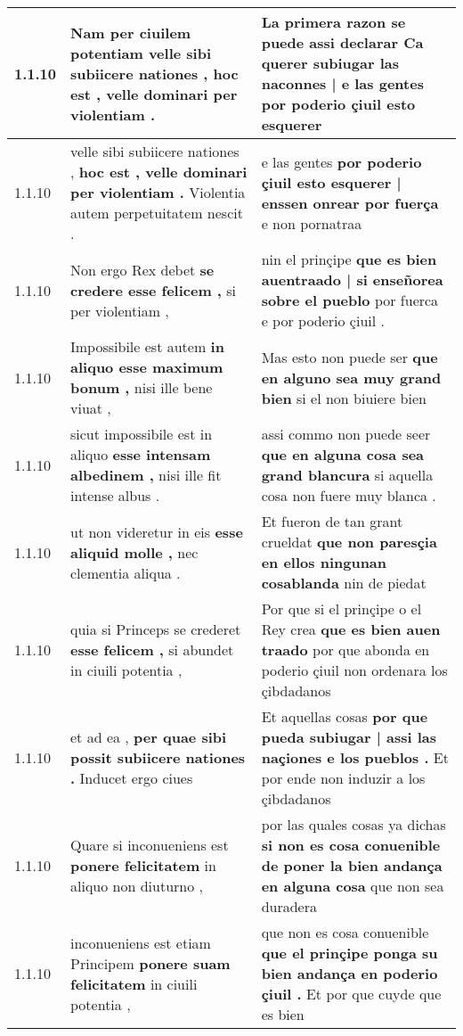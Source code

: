 \begin{tabular}{|p{1cm}|p{6.5cm}|p{6.5cm}|}
1.1.10 & Nam per ciuilem potentiam \textbf{ velle sibi subiicere nationes , } hoc est , velle dominari per violentiam . & La primera razon se puede assi declarar \textbf{ Ca querer subiugar las naconnes | e las gentes } por poderio çiuil esto esquerer \\\hline
1.1.10 & velle sibi subiicere nationes , \textbf{ hoc est , velle dominari per violentiam . } Violentia autem perpetuitatem nescit . & e las gentes \textbf{ por poderio çiuil esto esquerer | enssen onrear por fuerça } e non pornatraa \\\hline
1.1.10 & Non ergo Rex debet \textbf{ se credere esse felicem , } si per violentiam , & nin el prinçipe \textbf{ que es bien auentraado | si enseñorea sobre el pueblo } por fuerca e por poderio çiuil . \\\hline
1.1.10 & Impossibile est autem \textbf{ in aliquo esse maximum bonum , } nisi ille bene viuat , & Mas esto non puede ser \textbf{ que en alguno sea muy grand bien } si el non biuiere bien \\\hline
1.1.10 & sicut impossibile est in aliquo \textbf{ esse intensam albedinem , } nisi ille fit intense albus . & assi commo non puede seer \textbf{ que en alguna cosa sea grand blancura } si aquella cosa non fuere muy blanca . \\\hline
1.1.10 & ut non videretur in eis \textbf{ esse aliquid molle , } nec clementia aliqua . & Et fueron de tan grant crueldat \textbf{ que non paresçia en ellos ningunan cosablanda } nin de piedat \\\hline
1.1.10 & quia si Princeps se crederet \textbf{ esse felicem , } si abundet in ciuili potentia , & Por que si el prinçipe o el Rey crea \textbf{ que es bien auen traado } por que abonda en poderio çiuil non ordenara los çibdadanos \\\hline
1.1.10 & et ad ea , \textbf{ per quae sibi possit subiicere nationes . } Inducet ergo ciues & Et aquellas cosas \textbf{ por que pueda subiugar | assi las naçiones e los pueblos . } Et por ende non induzir a los çibdadanos \\\hline
1.1.10 & Quare si inconueniens est \textbf{ ponere felicitatem } in aliquo non diuturno , & por las quales cosas ya dichas \textbf{ si non es cosa conuenible de poner la bien andança en alguna cosa } que non sea duradera \\\hline
1.1.10 & inconueniens est etiam Principem \textbf{ ponere suam felicitatem } in ciuili potentia , & que non es cosa conuenible \textbf{ que el prinçipe ponga su bien andança en poderio çiuil . } Et por que cuyde que es bien \\\hline

\end{tabular}

